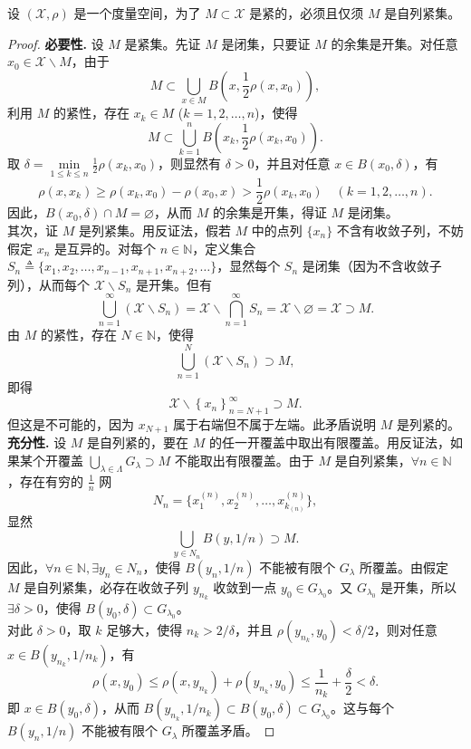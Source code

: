 \documentclass[lang=cn,newtx,10pt,scheme=chinese,thmcnt=chapter]{elegantbook}
\begin{document}
\begin{theorem}
设 \( (\mathscr{X}, \rho) \) 是一个度量空间，为了 \( M \subset \mathscr{X} \) 是紧的，必须且仅须 \( M \) 是自列紧集。
\end{theorem}
\begin{proof}
\textbf{必要性.} 设 \( M \) 是紧集。先证 \( M \) 是闭集，只要证 \( M \) 的余集是开集。对任意 \( x_0 \in \mathscr{X} \backslash M \)，由于
\[
M \subset \bigcup_{x \in M} B\left(x, \frac{1}{2} \rho\left(x, x_0\right)\right),
\]
利用 \( M \) 的紧性，存在 \( x_k \in M \) (\( k = 1, 2, \dots, n \))，使得
\[
M \subset \bigcup_{k=1}^n B\left(x_k, \frac{1}{2} \rho\left(x_k, x_0\right)\right).
\]
取 \( \delta = \min\limits_{1 \leqslant k \leqslant n} \frac{1}{2} \rho\left(x_k, x_0\right) \)，则显然有 \( \delta > 0 \)，并且对任意 \( x \in B\left(x_0, \delta\right) \)，有
\[
\rho\left(x, x_k\right) \geqslant \rho\left(x_k, x_0\right) - \rho\left(x_0, x\right) > \frac{1}{2}\rho(x_k,x_0) \quad (k = 1, 2, \dots, n).
\]
因此，\( B\left(x_0, \delta\right) \cap M = \varnothing \)，从而 \( M \) 的余集是开集，得证 \( M \) 是闭集。\\
其次，证 \( M \) 是列紧集。用反证法，假若 \( M \) 中的点列 \( \{x_n\} \) 不含有收敛子列，不妨假定 \( x_n \) 是互异的。对每个 \( n \in \mathbb{N} \)，定义集合 \( S_n \triangleq \{x_1, x_2, \dots, x_{n-1}, x_{n+1}, x_{n+2}, \dots\} \)，显然每个 \( S_n \) 是闭集（因为不含收敛子列），从而每个 \( \mathscr{X} \backslash S_n \) 是开集。但有
\[
\bigcup_{n=1}^{\infty} \left( \mathscr{X} \backslash S_n \right) = \mathscr{X} \backslash \bigcap_{n=1}^{\infty} S_n = \mathscr{X} \backslash \varnothing = \mathscr{X} \supset M.
\]
由 \( M \) 的紧性，存在 \( N \in \mathbb{N} \)，使得
\[
\bigcup_{n=1}^N \left( \mathscr{X} \backslash S_n \right) \supset M,
\]
即得
\[
\mathscr{X} \backslash \left\{ x_n \right\}_{n=N+1}^{\infty} \supset M.
\]
但这是不可能的，因为 \( x_{N+1} \) 属于右端但不属于左端。此矛盾说明 \( M \) 是列紧的。\\
\textbf{充分性.} 设 \( M \) 是自列紧的，要在 \( M \) 的任一开覆盖中取出有限覆盖。用反证法，如果某个开覆盖 \( \bigcup_{\lambda \in \Lambda} G_\lambda \supset M \) 不能取出有限覆盖。由于 \( M \) 是自列紧集，\( \forall n \in \mathbb{N} \)，存在有穷的 \( \frac{1}{n} \) 网
\[
N_n = \{x_1^{(n)}, x_2^{(n)}, \dots, x_{k_{(n)}}^{(n)}\},
\]
显然
\[
\bigcup_{y \in N_n} B(y, 1/n) \supset M.
\]
因此，\( \forall n \in \mathbb{N}, \exists y_n \in N_n \)，使得 \( B(y_n, 1/n) \) 不能被有限个 \( G_\lambda \) 所覆盖。由假定 \( M \) 是自列紧集，必存在收敛子列 \( y_{n_k} \) 收敛到一点 \( y_0 \in G_{\lambda_0} \)。又 \( G_{\lambda_0} \) 是开集，所以 \( \exists \delta > 0 \)，使得 \( B(y_0, \delta) \subset G_{\lambda_0} \)。\\
对此 \( \delta > 0 \)，取 \( k \) 足够大，使得 \( n_k > 2/\delta \)，并且 \( \rho(y_{n_k}, y_0) < \delta/2 \)，则对任意 \( x \in B(y_{n_k}, 1/n_k) \)，有
\[
\rho(x, y_0) \leqslant \rho(x, y_{n_k}) + \rho(y_{n_k}, y_0) \leqslant \frac{1}{n_k} + \frac{\delta}{2} < \delta.
\]
即 \( x \in B(y_0, \delta) \)，从而 \( B(y_{n_k}, 1/n_k) \subset B(y_0, \delta) \subset G_{\lambda_0} \)。这与每个 \( B(y_n, 1/n) \) 不能被有限个 \( G_\lambda \) 所覆盖矛盾。
\end{proof}
\end{document}
